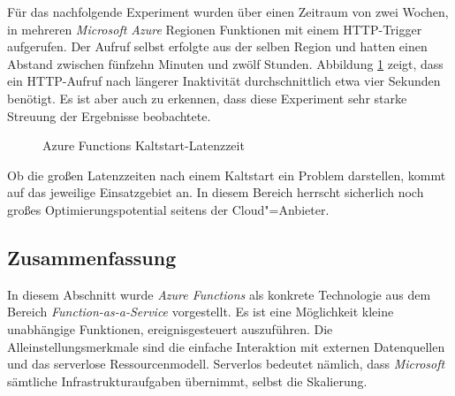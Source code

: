 Für das nachfolgende Experiment wurden über einen Zeitraum von zwei Wochen, in mehreren \textit{Microsoft Azure} Regionen Funktionen mit einem HTTP-Trigger aufgerufen. Der Aufruf selbst erfolgte aus der selben Region und hatten einen Abstand zwischen fünfzehn Minuten und zwölf Stunden. Abbildung \ref{fig:azfun-latency} zeigt, dass ein HTTP-Aufruf nach längerer Inaktivität durchschnittlich etwa vier Sekunden benötigt. Es ist aber auch zu erkennen, dass diese Experiment sehr starke Streuung der Ergebnisse beobachtete.

\begin{figure}[!hbt]%
\caption{Azure Functions Kaltstart-Latenzzeit}%
\label{fig:azfun-latency}%
\centering
{}

\end{figure}

Ob die großen Latenzzeiten nach einem Kaltstart ein Problem darstellen, kommt auf das jeweilige Einsatzgebiet an. In diesem Bereich herrscht sicherlich noch großes Optimierungspotential seitens der Cloud"=Anbieter. 

\subsection{Zusammenfassung}

In diesem Abschnitt wurde \textit{Azure Functions} als konkrete Technologie aus dem Bereich \textit{Function-as-a-Service} vorgestellt. Es ist eine Möglichkeit kleine unabhängige Funktionen, ereignisgesteuert auszuführen. Die Alleinstellungsmerkmale sind die einfache Interaktion mit externen Datenquellen und das serverlose Ressourcenmodell. Serverlos bedeutet nämlich, dass \textit{Microsoft} sämtliche Infrastrukturaufgaben übernimmt, selbst die Skalierung.

